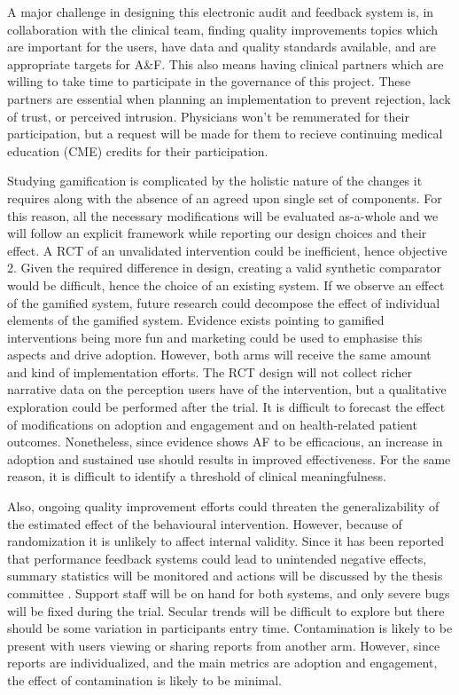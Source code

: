 A major challenge in designing this electronic audit and feedback system is, in collaboration with the clinical team, finding quality improvements topics which are important for the users, have data and quality standards available, and are appropriate targets for A\&F. This also means having clinical partners which are willing to take time to participate in the governance of this project. These partners are essential when planning an implementation to prevent rejection, lack of trust, or perceived intrusion. Physicians won't be remunerated for their participation, but a request will be made for them to recieve continuing medical education (CME) credits for their participation.

Studying gamification is complicated by the holistic nature of the changes it requires along with the absence of an agreed upon single set of components. For this reason, all the necessary modifications will be evaluated as-a-whole and we will follow an explicit framework while reporting our design choices and their effect. A RCT of an unvalidated intervention could be inefficient, hence objective 2. Given the required difference in design, creating a valid synthetic comparator would be difficult, hence the choice of an existing system. If we observe an effect of the gamified system, future research could decompose the effect of individual elements of the gamified system. Evidence exists pointing to gamified interventions being more fun and marketing could be used to emphasise this aspects and drive adoption. However, both arms will receive the same amount and kind of implementation efforts. The RCT design will not collect richer narrative data on the perception users have of the intervention, but a qualitative exploration could be performed after the trial. It is difficult to forecast the effect of modifications on adoption and engagement and on health-related patient outcomes. Nonetheless, since evidence shows \gls{AF} to be efficacious, an increase in adoption and sustained use should results in improved effectiveness. For the same reason, it is difficult to identify a threshold of clinical meaningfulness.

Also, ongoing quality improvement efforts could threaten the generalizability of the estimated effect of the behavioural intervention. However, because of randomization it is unlikely to affect internal validity. Since it has been reported that performance feedback systems could lead to unintended negative effects, summary statistics will be monitored and actions will be discussed by the thesis committee \cite{terris2009attribution}. Support staff will be on hand for both systems, and only severe bugs will be fixed during the trial. Secular trends will be difficult to explore but there should be some variation in participants entry time. Contamination is likely to be present with users viewing or sharing reports from another arm. However, since reports are individualized, and the main metrics are adoption and engagement, the effect of contamination is likely to be minimal.

